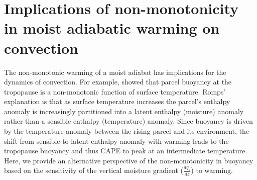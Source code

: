 \documentclass[draft]{ametsocV6.1}
\begin{document}
\section{Implications of non-monotonicity in moist adiabatic warming on convection}
The non-monotonic warming of a moist adiabat has implications for the dynamics of convection. For example, \cite{romps2016} showed that parcel buoyancy at the tropopause is a non-monotonic function of surface temperature. Romps' explanation is that as surface temperature increases the parcel's enthalpy anomaly is increasingly partitioned into a latent enthalpy (moisture) anomaly rather than a sensible enthalpy (temperature) anomaly. Since buoyancy is driven by the temperature anomaly between the rising parcel and its environment, the shift from sensible to latent enthalpy anomaly with warming leads to the tropopause buoyancy and thus CAPE to peak at an intermediate temperature. Here, we provide an alternative perspective of the non-monotonicity in buoyancy based on the sensitivity of the vertical moisture gradient ($\frac{dq_s}{dz}$) to warming.
\end{document}
